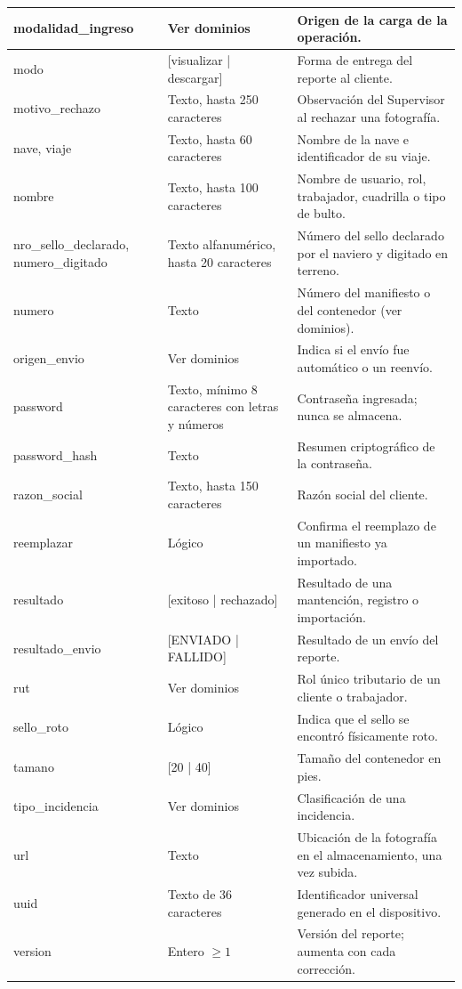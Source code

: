 {\begin{longtable}{|L{3.3cm}|L{3.3cm}|L{8.0cm}|}
modalidad\_ingreso & Ver dominios & Origen de la carga de la operación. \\ \hline
modo & [visualizar | descargar] & Forma de entrega del reporte al cliente. \\ \hline
motivo\_rechazo & Texto, hasta 250 caracteres & Observación del Supervisor al rechazar una
fotografía. \\ \hline
nave, viaje & Texto, hasta 60 caracteres & Nombre de la nave e identificador de su viaje. \\
\hline
nombre & Texto, hasta 100 caracteres & Nombre de usuario, rol, trabajador, cuadrilla o tipo
de bulto. \\ \hline
nro\_sello\_declarado, numero\_digitado & Texto alfanumérico, hasta 20 caracteres & Número
del sello declarado por el naviero y digitado en terreno. \\ \hline
numero & Texto & Número del manifiesto o del contenedor (ver dominios). \\ \hline
origen\_envio & Ver dominios & Indica si el envío fue automático o un reenvío. \\ \hline
password & Texto, mínimo 8 caracteres con letras y números & Contraseña ingresada; nunca
se almacena. \\ \hline
password\_hash & Texto & Resumen criptográfico de la contraseña. \\ \hline
razon\_social & Texto, hasta 150 caracteres & Razón social del cliente. \\ \hline
reemplazar & Lógico & Confirma el reemplazo de un manifiesto ya importado. \\ \hline
resultado & [exitoso | rechazado] & Resultado de una mantención, registro o importación. \\
\hline
resultado\_envio & [ENVIADO | FALLIDO] & Resultado de un envío del reporte. \\ \hline
rut & Ver dominios & Rol único tributario de un cliente o trabajador. \\ \hline
sello\_roto & Lógico & Indica que el sello se encontró físicamente roto. \\ \hline
tamano & [20 | 40] & Tamaño del contenedor en pies. \\ \hline
tipo\_incidencia & Ver dominios & Clasificación de una incidencia. \\ \hline
url & Texto & Ubicación de la fotografía en el almacenamiento, una vez subida. \\ \hline
uuid & Texto de 36 caracteres & Identificador universal generado en el dispositivo. \\
\hline
version & Entero $\geq 1$ & Versión del reporte; aumenta con cada corrección. \\ \hline
\end{longtable}
}

